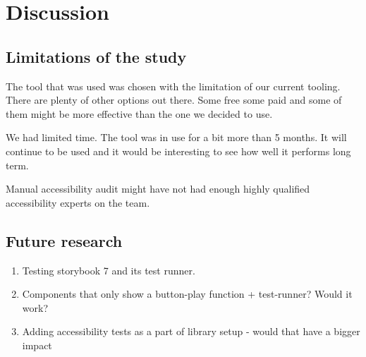 \documentclass{master_thesis}
\begin{document}
\section{Discussion}

\subsection{Limitations of the study}

The tool that was used was chosen with the limitation of our current tooling. There are plenty of other options out there. Some free some paid and some of them might be more effective than the one we decided to use.

We had limited time. The tool was in use for a bit more than 5 months. It will continue to be used and it would be interesting to see how well it performs long term.

Manual accessibility audit might have not had enough highly qualified accessibility experts on the team.

\subsection{Future research}

\begin{enumerate}
	\item Testing storybook 7 and its test runner.
	\item Components that only show a button-play function + test-runner? Would it work?
	\item Adding accessibility tests as a part of library setup - would that have a bigger impact
\end{enumerate}

\end{document}
